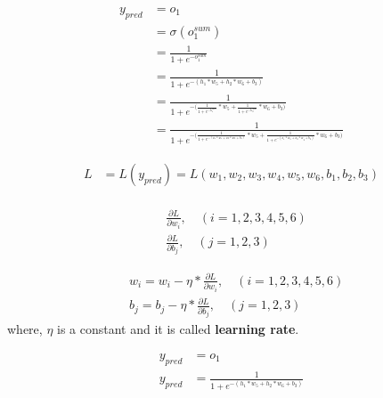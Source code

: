 \documentclass[a4paper,12pt]{article}
\begin{document}
\begin{equation*}
\begin{aligned}
y_{pred} &= o_1 \\
         &= \sigma(o^{sum}_{1}) \\
         &= \frac{1}{1 + e^{-o^{sum}_{1}}} \\
         &= \frac{1}{1 + e^{-(h_{1} * w_5 + h_{2} * w_6 + b_3)}} \\
         &= \frac{1}{1 + e^{-\Big(\frac{1}{1 + e^{-h^{sum}_{1}}} * w_5 + \frac{1}{1 + e^{-h^{sum}_{2}}} * w_6 + b_3\Big)}} \\
         &= \frac{1}{1 + e^{-\Big(\frac{1}{1 + e^{-(x_1 * w_1 + x_2 * w_2 + b_1)}} * w_5 + \frac{1}{1 + e^{-(x_1 * w_3 + x_2 * w_4 + b_2)}} * w_6 + b_3\Big)}}
\end{aligned}
\end{equation*}

\begin{equation*}
\begin{aligned}
L &= L(y_{pred}) = L(w_1, w_2, w_3, w_4, w_5, w_6, b_1, b_2, b_3)
\end{aligned}
\end{equation*}
\\[1cm]

\begin{equation*}
\begin{aligned}
&\frac{\partial{L}}{\partial{w_i}}, \quad (i = 1, 2, 3, 4, 5, 6) \\
&\frac{\partial{L}}{\partial{b_j}}, \quad (j = 1, 2, 3)
\end{aligned}
\end{equation*}

\begin{equation*}
\begin{aligned}
&w_i = w_i - \eta * \frac{\partial{L}}{\partial{w_i}}, \quad (i = 1, 2, 3, 4, 5, 6) \\
&b_j = b_j - \eta * \frac{\partial{L}}{\partial{b_j}}, \quad (j = 1, 2, 3)
\end{aligned}
\end{equation*}
where, $\eta$ is a constant and it is called \textbf{learning rate}.

\begin{equation*}
\begin{aligned}
y_{pred} &= o_1 \\
y_{pred} &= \frac{1}{1 + e^{-(h_{1} * w_5 + h_{2} * w_6 + b_3)}}
\end{aligned}
\end{equation*}
\end{document}
